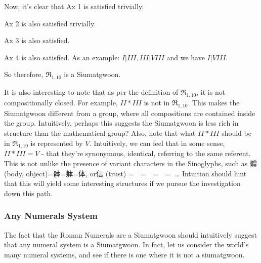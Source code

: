 Now, it's clear that Ax 1 is satisfied trivially. 

Ax 2 is also satisfied trivially.

Ax 3 is also satisfied. 

Ax 4 is also satisfied. As an example: $I | III, III | VIII$ and we have $I|VIII$.

So therefore, $\mathfrak{R}_{1,10}$ is a Siumatgwoon. 

It is also interesting to note that as per the definition of $\mathfrak{R}_{1,10}$, it is not compositionally closed. For example, $II * III$ is not in $\mathfrak{R}_{1,10}$. This makes the Siumatgwoon different from a group, where all compositions are contained inside the group. Intuitively, perhaps this suggests the Siumatgwoon is less rich in structure than the mathematical group? Also, note that what $II * III$ should be in $\mathfrak{R}_{1,10}$ is represented by $V$. Intuitively, we can feel that in some sense, $II * III = V$ - that they're synonymous, identical, referring to the same referent. This is not unlike the presence of variant characters in the Sinoglyphs, such as 體 (body, object)=骵=躰=体, or信 (trust) = 𬢭 = 伩 = 訫 = 㐰… Intuition should hint that this will yield some interesting structures if we pursue the investigation down this path.

\subsubsection{Any Numerals System}

The fact that the Roman Numerals are a Siumatgwoon should intuitively suggest that any numeral system is a Siumatgwoon. In fact, let us consider the world's many numeral systems, and see if there is one where it is not a siumatgwoon. 

